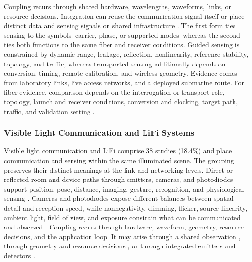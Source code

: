 Coupling recurs through shared hardware, wavelengths, waveforms, links, or
resource decisions. Integration can reuse the communication signal itself
\cite{OISAC_SCR00647,OISAC_SCR00038,OISAC_SCR00356,OISAC_SCR00432,OISAC_SCR00015}
or place distinct data and sensing signals on shared infrastructure
\cite{OISAC_SCR00013,OISAC_SCR00344,OISAC_SCR00957,OISAC_SCR00218,OISAC_SCR00679}.
The first form ties sensing to the symbols, carrier, phase, or supported modes,
whereas the second ties both functions to the same fiber and receiver
conditions. Guided sensing is constrained by dynamic range, leakage,
reflection, nonlinearity, reference stability, topology, and traffic, whereas
transported sensing additionally depends on conversion, timing, remote
calibration, and wireless geometry. Evidence comes from laboratory links, live
access networks, and a deployed submarine route. For fiber evidence, comparison
depends on the interrogation or transport role, topology, launch and receiver
conditions, conversion and clocking, target path, traffic, and validation setting
\cite{OISAC_SCR00647,OISAC_SCR00038,OISAC_SCR00218,OISAC_SCR00957,
OISAC_SCR00631,OISAC_SCR00496,OISAC_SCR01049}.

\subsubsection{Visible Light Communication and LiFi Systems}

Visible light communication and LiFi comprise 38 studies (18.4\%) and place
communication and sensing within the same illuminated scene. The grouping
preserves their distinct meanings at the link and networking levels. Direct or
reflected room and
device paths through emitters, cameras, and photodiodes support position, pose,
distance, imaging, gesture, recognition, and physiological sensing
\cite{OISAC_SCR00910,OISAC_SCR01034,OISAC_SCR00196}. Cameras and photodiodes
expose different balances between spatial detail and reception speed, while
nonnegativity, dimming, flicker, source linearity, ambient light, field of view,
and exposure constrain what can be communicated and observed
\cite{OISAC_SCR00273,OISAC_SCR00925,OISAC_SCR00910,OISAC_SCR01036}.
Coupling recurs through hardware, waveform, geometry, resource decisions, and
the application loop. It may arise through a shared observation
\cite{OISAC_SCR01034,OISAC_SCR00836}, through geometry and resource decisions
\cite{OISAC_SCR00901,OISAC_SCR00905,OISAC_SCR00407,OISAC_SCR00557,OISAC_SCR00915},
or through integrated emitters and detectors
\cite{OISAC_SCR00943,OISAC_SCR00873,OISAC_SCR00001}.

